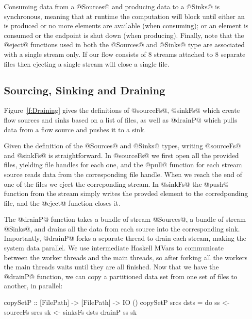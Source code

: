 Consuming data from a @Sources@ and producing data to a @Sinks@ is synchronous, meaning that at runtime the computation will block until either an is produced or no more elements are available (when consuming); or an element is consumed or the endpoint is shut down (when producing). Finally, note that the @eject@ functions used in both the @Sources@ and @Sinks@ type are associated with a single stream only. If our flow consists of 8 streams attached to 8 separate files then ejecting a single stream will close a single file.

\subsection{Sourcing, Sinking and Draining}
Figure~\ref{f:Draining} gives the definitions of @sourceFs@, @sinkFs@ which create flow sources and sinks based on a list of files, as well as @drainP@ which pulls data from a flow source and pushes it to a sink. 

Given the definition of the @Sources@ and @Sinks@ types, writing @sourceFs@ and @sinkFs@ is straightforward. In @sourceFs@ we first open all the provided files, yielding file handles for each one, and the @pull@ function for each stream source reads data from the corresponding file handle. When we reach the end of one of the files we eject the correponding stream. In @sinkFs@ the @push@ function from the stream simply writes the provded element to the corredponding file, and the @eject@ function closes it.

The @drainP@ function takes a bundle of stream @Sources@, a bundle of stream @Sinks@, and drains all the data from each source into the corresponding sink. Importantly, @drainP@ forks a separate thread to drain each stream, making the system data parallel. We use intermediate Haskell MVars to communicate between the worker threads and the main threads, so after forking all the workers the main threads waits until they are all finished. Now that we have the @drainP@ function, we can copy a partitioned data set from one set of files to another, in parallel:

\begin{code}
 copySetP :: [FilePath] -> [FilePath] -> IO ()
 copySetP srcs dsts
  = do  ss <- sourceFs srcs
        sk <- sinksFs  dsts
        drainP ss sk
\end{code}


